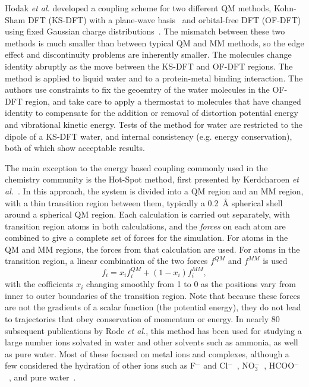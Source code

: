 \documentclass[11pt]{revtex4}
\begin{document}
Hodak {\it et al.} developed a coupling scheme for two different
QM methods, Kohn-Sham DFT (KS-DFT) with a plane-wave basis~\cite{kohn_phys_rev_1965a}
and orbital-free DFT (OF-DFT) using fixed Gaussian charge
distributions~\cite{hodak_j_chem_phys_2008a}.  The mismatch between
these two methods is much smaller than between typical QM and MM
methods, so the edge effect and discontinuity problems are inherently
smaller.  The molecules change identity abruptly as the move between
the KS-DFT and OF-DFT regions.  The method is applied to liquid
water and to a protein-metal binding interaction.  The authors use
constraints to fix the geoemtry of the water molecules in the OF-DFT
region, and take care to apply a thermostat to molecules that have
changed identity to compensate for the addition or removal of
distortion potential energy and vibrational kinetic energy.  Tests
of the method for water are restricted to the dipole of a KS-DFT
water, and internal consistency (e.g. energy conservation), both
of which show acceptable results.

The main exception to the energy based coupling commonly used in
the chemistry community is the Hot-Spot method, first presented by
Kerdcharoen {\it et al.}~\cite{kerdcharoen_chem_phys_1996a}.  In
this approach, the system is divided into a QM region and an MM
region, with a thin transition region between them, typically a
0.2~{\AA} spherical shell around a spherical QM region.  Each
calculation is carried out separately, with transition region atoms
in both calculations, and the {\em forces} on each atom are combined
to give a complete set of forces for the simulation.   For atoms
in the QM and MM regions, the forces from that calculation are used.
For atoms in the transition region, a linear combination of the two
forces $f^{QM}$ and $f^{MM}$ is used
$$f_i = x_i f_i^{QM} + (1-x_i) f_i^{MM},$$
with the cofficients $x_i$ changing smoothly from 1 to 0
as the positions vary from inner to outer boundaries of the transition
region.  Note that because these forces are not the gradients of a
scalar function (the potential energy), they do not lead to
trajectories that obey conservation of momentum or energy.  In
nearly 80 subsequent publications by Rode {\it et al.}, this method
has been used for studying a large number ions solvated in water
and other solvents such as ammonia, as well as pure water.  Most
of these focused on metal ions and complexes, although a few
considered the hydration of other ions such as F$^-$ and
Cl$^-$~\cite{tongraar_phys_chem_chem_phys_2003a,tongraar_chem_phys_lett_2005a},
NO$_3^-$~\cite{tongraar_j_phys_chem_a_2006a},
HCOO$^-$~\cite{payaka_j_phys_chem_a_2009a}, and pure
water~\cite{xenides_j_chem_phys_2005a,xenides_j_mol_liq_2006a}.
\end{document}
